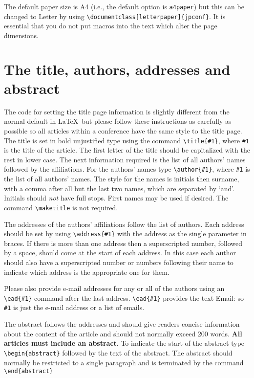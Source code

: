 \documentclass[a4paper]{jpconf}
\begin{document}
The default paper size is A4 (i.e., the default option is {\tt a4paper}) but this can be changed to Letter by 
using \verb"\documentclass[letterpaper]{jpconf}". It is essential that you do not put macros into the text which alter the page dimensions.

\section{The title, authors, addresses and abstract} 
The code for setting the title page information is slightly different from
the normal default in \LaTeX\ but please follow these instructions as carefully as possible so all articles within a conference have the same style to the title page. 
The title is set in bold unjustified type using the command
\verb"\title{#1}", where \verb"#1" is the title of the article. The
first letter of the title should be capitalized with the rest in lower case. 
The next information required is the list of all authors' names followed by 
the affiliations. For the authors' names type \verb"\author{#1}", 
where \verb"#1" is the 
list of all authors' names. The style for the names is initials then
surname, with a comma after all but the last 
two names, which are separated by `and'. Initials should {\it not} have 
full stops. First names may be used if desired. The command \verb"\maketitle" is not
required.

The addresses of the authors' affiliations follow the list of authors. 
Each address should be set by using
\verb"\address{#1}" with the address as the single parameter in braces. 
If there is more 
than one address then a superscripted number, followed by a space, should come at the start of
each address. In this case each author should also have a superscripted number or numbers following their name to indicate which address is the appropriate one for them.
 
Please also provide e-mail addresses for any or all of the authors using an \verb"\ead{#1}" command after the last address. \verb"\ead{#1}" provides the text Email: so \verb"#1" is just the e-mail address or a list of emails.  

The abstract follows the addresses and
should give readers concise information about the content 
of the article and should not normally exceed 200 
words. {\bf All articles must include an abstract}. To indicate the start 
of the abstract type \verb"\begin{abstract}" followed by the text of the 
abstract.  The abstract should normally be restricted 
to a single paragraph and is terminated by the command
\verb"\end{abstract}"
\end{document}

